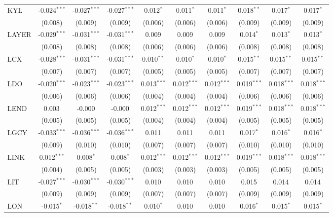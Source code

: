 \begin{table}[!htbp]
\begin{tabular}{@{\extracolsep{5pt}}lccccccccc}
 KYL & -0.024$^{***}$ & -0.027$^{***}$ & -0.027$^{***}$ & 0.012$^{*}$ & 0.011$^{*}$ & 0.011$^{*}$ & 0.018$^{**}$ & 0.017$^{*}$ & 0.017$^{*}$ \\
  & (0.008) & (0.009) & (0.009) & (0.006) & (0.006) & (0.006) & (0.009) & (0.009) & (0.009) \\
 LAYER & -0.029$^{***}$ & -0.031$^{***}$ & -0.031$^{***}$ & 0.009$^{}$ & 0.009$^{}$ & 0.009$^{}$ & 0.014$^{*}$ & 0.013$^{*}$ & 0.013$^{*}$ \\
  & (0.008) & (0.008) & (0.008) & (0.006) & (0.006) & (0.006) & (0.008) & (0.008) & (0.008) \\
 LCX & -0.028$^{***}$ & -0.031$^{***}$ & -0.031$^{***}$ & 0.010$^{**}$ & 0.010$^{*}$ & 0.010$^{*}$ & 0.015$^{**}$ & 0.015$^{**}$ & 0.015$^{**}$ \\
  & (0.007) & (0.007) & (0.007) & (0.005) & (0.005) & (0.005) & (0.007) & (0.007) & (0.007) \\
 LDO & -0.020$^{***}$ & -0.023$^{***}$ & -0.023$^{***}$ & 0.013$^{***}$ & 0.012$^{***}$ & 0.012$^{***}$ & 0.019$^{***}$ & 0.018$^{***}$ & 0.018$^{***}$ \\
  & (0.006) & (0.006) & (0.006) & (0.004) & (0.004) & (0.004) & (0.006) & (0.006) & (0.006) \\
 LEND & 0.003$^{}$ & -0.000$^{}$ & -0.000$^{}$ & 0.012$^{***}$ & 0.012$^{***}$ & 0.012$^{***}$ & 0.019$^{***}$ & 0.018$^{***}$ & 0.018$^{***}$ \\
  & (0.005) & (0.005) & (0.005) & (0.004) & (0.004) & (0.004) & (0.005) & (0.005) & (0.005) \\
 LGCY & -0.033$^{***}$ & -0.036$^{***}$ & -0.036$^{***}$ & 0.011$^{}$ & 0.011$^{}$ & 0.011$^{}$ & 0.017$^{*}$ & 0.016$^{*}$ & 0.016$^{*}$ \\
  & (0.009) & (0.010) & (0.010) & (0.007) & (0.007) & (0.007) & (0.010) & (0.010) & (0.010) \\
 LINK & 0.012$^{***}$ & 0.008$^{*}$ & 0.008$^{*}$ & 0.012$^{***}$ & 0.012$^{***}$ & 0.012$^{***}$ & 0.019$^{***}$ & 0.018$^{***}$ & 0.018$^{***}$ \\
  & (0.004) & (0.005) & (0.005) & (0.003) & (0.003) & (0.003) & (0.005) & (0.005) & (0.005) \\
 LIT & -0.027$^{***}$ & -0.030$^{***}$ & -0.030$^{***}$ & 0.010$^{}$ & 0.010$^{}$ & 0.010$^{}$ & 0.015$^{}$ & 0.014$^{}$ & 0.014$^{}$ \\
  & (0.009) & (0.009) & (0.009) & (0.007) & (0.007) & (0.007) & (0.009) & (0.009) & (0.009) \\
 LON & -0.015$^{*}$ & -0.018$^{**}$ & -0.018$^{**}$ & 0.010$^{*}$ & 0.010$^{}$ & 0.010$^{}$ & 0.016$^{*}$ & 0.015$^{*}$ & 0.015$^{*}$ \\

\end{tabular}
\end{table}
